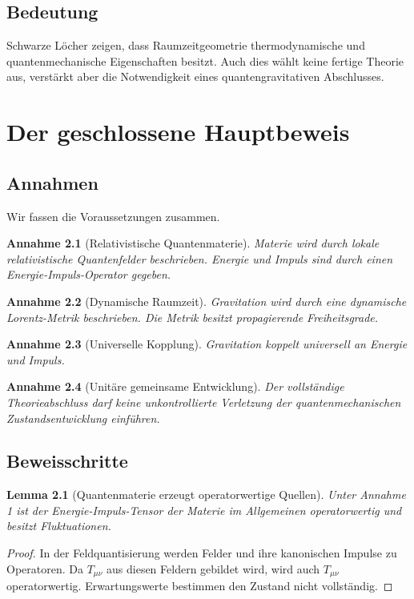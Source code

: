 \documentclass[11pt,a4paper,openany]{book}
\newtheorem{lemma}{Lemma}[chapter]
\newtheorem{axiom}{Annahme}[chapter]
\theoremstyle{remark}
\begin{document}
\section{Bedeutung}
Schwarze Löcher zeigen, dass Raumzeitgeometrie thermodynamische und quantenmechanische Eigenschaften besitzt. Auch dies wählt keine fertige Theorie aus, verstärkt aber die Notwendigkeit eines quantengravitativen Abschlusses.

\chapter{Der geschlossene Hauptbeweis}
\section{Annahmen}
Wir fassen die Voraussetzungen zusammen.

\begin{axiom}[Relativistische Quantenmaterie]
Materie wird durch lokale relativistische Quantenfelder beschrieben. Energie und Impuls sind durch einen Energie-Impuls-Operator gegeben.
\end{axiom}

\begin{axiom}[Dynamische Raumzeit]
Gravitation wird durch eine dynamische Lorentz-Metrik beschrieben. Die Metrik besitzt propagierende Freiheitsgrade.
\end{axiom}

\begin{axiom}[Universelle Kopplung]
Gravitation koppelt universell an Energie und Impuls.
\end{axiom}

\begin{axiom}[Unitäre gemeinsame Entwicklung]
Der vollständige Theorieabschluss darf keine unkontrollierte Verletzung der quantenmechanischen Zustandsentwicklung einführen.
\end{axiom}

\section{Beweisschritte}
\begin{lemma}[Quantenmaterie erzeugt operatorwertige Quellen]
Unter Annahme 1 ist der Energie-Impuls-Tensor der Materie im Allgemeinen operatorwertig und besitzt Fluktuationen.
\end{lemma}
\begin{proof}
In der Feldquantisierung werden Felder und ihre kanonischen Impulse zu Operatoren. Da $T_{\mu\nu}$ aus diesen Feldern gebildet wird, wird auch $T_{\mu\nu}$ operatorwertig. Erwartungswerte bestimmen den Zustand nicht vollständig.
\end{proof}
\end{document}
